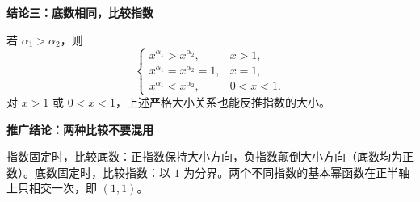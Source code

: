 \begin{statementbox}
  \medskip
  \end{statementbox}\clearpage\begin{statementbox}

\textbf{\textcolor{CStatement}{结论三：底数相同，比较指数}}

  若 $\alpha_1>\alpha_2$，则
  \[
  \begin{cases}
  x^{\alpha_1}>x^{\alpha_2}, & x>1,\\
  x^{\alpha_1}=x^{\alpha_2}=1, & x=1,\\
  x^{\alpha_1}<x^{\alpha_2}, & 0<x<1.
  \end{cases}
  \]
  对 $x>1$ 或 $0<x<1$，上述严格大小关系也能反推指数的大小。

  \medskip
  \textbf{\textcolor{CStatement}{推广结论：两种比较不要混用}}

  指数固定时，比较底数：正指数保持大小方向，负指数颠倒大小方向（底数均为正数）。底数固定时，比较指数：以 $1$ 为分界。两个不同指数的基本幂函数在正半轴上只相交一次，即 $(1,1)$。
\end{statementbox}
